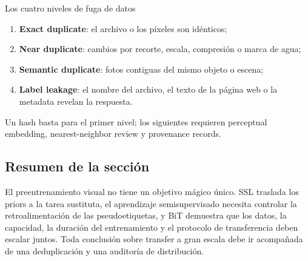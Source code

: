 
\begin{warningbox}{Los cuatro niveles de fuga de datos}
\begin{enumerate}
  \item \textbf{Exact duplicate}: el archivo o los píxeles son idénticos;
  \item \textbf{Near duplicate}: cambios por recorte, escala, compresión o marca de agua;
  \item \textbf{Semantic duplicate}: fotos contiguas del mismo objeto o escena;
  \item \textbf{Label leakage}: el nombre del archivo, el texto de la página web o la metadata revelan la respuesta.
\end{enumerate}
Un hash basta para el primer nivel; los siguientes requieren perceptual embedding, nearest-neighbor review y provenance records.
\end{warningbox}

\subsection{Resumen de la sección}

El preentrenamiento visual no tiene un objetivo mágico único. SSL traslada los priors a la tarea sustituta, el aprendizaje semisupervisado necesita controlar la retroalimentación de las pseudoetiquetas, y BiT demuestra que los datos, la capacidad, la duración del entrenamiento y el protocolo de transferencia deben escalar juntos. Toda conclusión sobre transfer a gran escala debe ir acompañada de una deduplicación y una auditoría de distribución.
